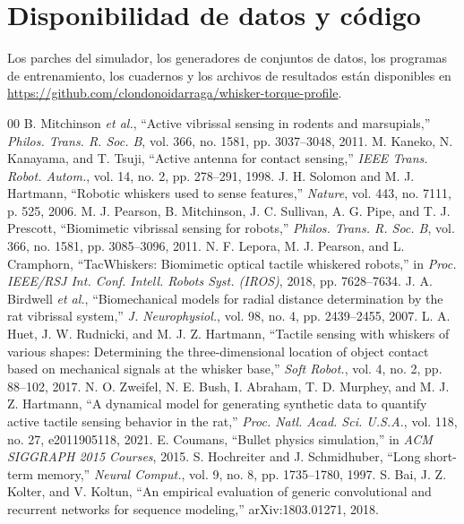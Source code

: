 \documentclass[conference]{IEEEtran}
\begin{document}
\section*{Disponibilidad de datos y código}
Los parches del simulador, los generadores de conjuntos de datos, los programas de entrenamiento, los cuadernos y los archivos de resultados están disponibles en \url{https://github.com/clondonoidarraga/whisker-torque-profile}.

\begin{thebibliography}{00}
 B. Mitchinson \emph{et al.}, ``Active vibrissal sensing in rodents and marsupials,'' \emph{Philos. Trans. R. Soc. B}, vol. 366, no. 1581, pp. 3037--3048, 2011.
 M. Kaneko, N. Kanayama, and T. Tsuji, ``Active antenna for contact sensing,'' \emph{IEEE Trans. Robot. Autom.}, vol. 14, no. 2, pp. 278--291, 1998.
 J. H. Solomon and M. J. Hartmann, ``Robotic whiskers used to sense features,'' \emph{Nature}, vol. 443, no. 7111, p. 525, 2006.
 M. J. Pearson, B. Mitchinson, J. C. Sullivan, A. G. Pipe, and T. J. Prescott, ``Biomimetic vibrissal sensing for robots,'' \emph{Philos. Trans. R. Soc. B}, vol. 366, no. 1581, pp. 3085--3096, 2011.
 N. F. Lepora, M. J. Pearson, and L. Cramphorn, ``TacWhiskers: Biomimetic optical tactile whiskered robots,'' in \emph{Proc. IEEE/RSJ Int. Conf. Intell. Robots Syst. (IROS)}, 2018, pp. 7628--7634.
 J. A. Birdwell \emph{et al.}, ``Biomechanical models for radial distance determination by the rat vibrissal system,'' \emph{J. Neurophysiol.}, vol. 98, no. 4, pp. 2439--2455, 2007.
 L. A. Huet, J. W. Rudnicki, and M. J. Z. Hartmann, ``Tactile sensing with whiskers of various shapes: Determining the three-dimensional location of object contact based on mechanical signals at the whisker base,'' \emph{Soft Robot.}, vol. 4, no. 2, pp. 88--102, 2017.
 N. O. Zweifel, N. E. Bush, I. Abraham, T. D. Murphey, and M. J. Z. Hartmann, ``A dynamical model for generating synthetic data to quantify active tactile sensing behavior in the rat,'' \emph{Proc. Natl. Acad. Sci. U.S.A.}, vol. 118, no. 27, e2011905118, 2021.
 E. Coumans, ``Bullet physics simulation,'' in \emph{ACM SIGGRAPH 2015 Courses}, 2015.
 S. Hochreiter and J. Schmidhuber, ``Long short-term memory,'' \emph{Neural Comput.}, vol. 9, no. 8, pp. 1735--1780, 1997.
 S. Bai, J. Z. Kolter, and V. Koltun, ``An empirical evaluation of generic convolutional and recurrent networks for sequence modeling,'' arXiv:1803.01271, 2018.

\end{thebibliography}
\end{document}
